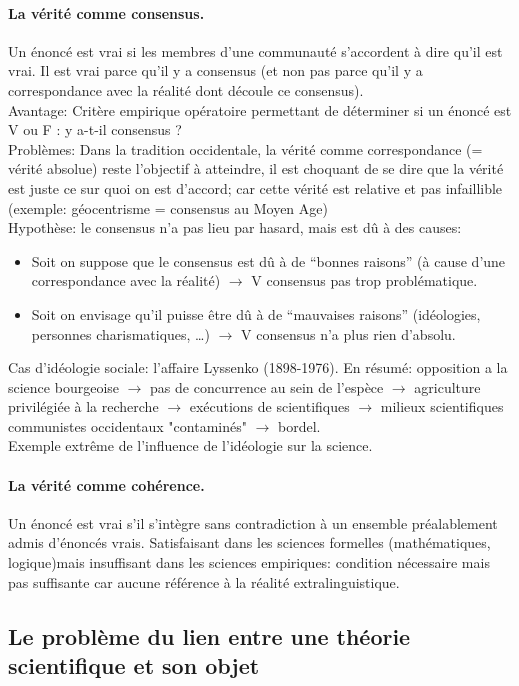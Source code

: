 \documentclass{report}
\begin{document}
	\paragraph{La vérité comme consensus.} Un énoncé est vrai si les membres d’une communauté s’accordent à dire qu’il est vrai. Il est vrai parce qu’il y a consensus (et non pas parce qu’il y a correspondance avec la réalité dont découle ce consensus).\\
	Avantage:  Critère empirique opératoire permettant de déterminer si un énoncé est V ou F : y a-t-il consensus ?\\
	Problèmes: Dans la tradition occidentale, la vérité comme correspondance (= vérité absolue) reste l’objectif à atteindre, il est choquant de se dire que la vérité est juste ce sur quoi on est d’accord; car cette vérité est relative et pas infaillible (exemple: géocentrisme = consensus au Moyen Age)\\
	Hypothèse: le consensus n’a pas lieu par hasard, mais est dû à des causes:
	\begin{itemize}
		\item Soit on suppose que le consensus est dû à de “bonnes raisons” (à cause d’une correspondance avec la réalité) $\rightarrow$ V consensus pas trop problématique.
		\item Soit on envisage qu’il puisse être dû à de “mauvaises raisons” (idéologies, personnes charismatiques, …) $\rightarrow$ V consensus n’a plus rien d’absolu.
	\end{itemize}
	Cas d'idéologie sociale: l’affaire Lyssenko (1898-1976). En résumé: opposition a la science bourgeoise $\rightarrow$ pas de concurrence au sein de l'espèce $\rightarrow$ agriculture privilégiée à la recherche $\rightarrow$ exécutions de scientifiques $\rightarrow$ milieux scientifiques communistes occidentaux "contaminés" $\rightarrow$ bordel.\\
	Exemple extrême de l’influence de l’idéologie sur la science.
	
	\paragraph{La vérité comme cohérence.} Un énoncé est vrai s’il s’intègre sans contradiction à un ensemble préalablement admis d’énoncés vrais. Satisfaisant dans les sciences formelles (mathématiques, logique)mais insuffisant dans les sciences empiriques: condition nécessaire mais pas suffisante car aucune référence à la réalité extralinguistique.
	
	\subsection[Lien théorie-objet]{Le problème du lien entre une théorie scientifique et son objet}
	
\end{document}
